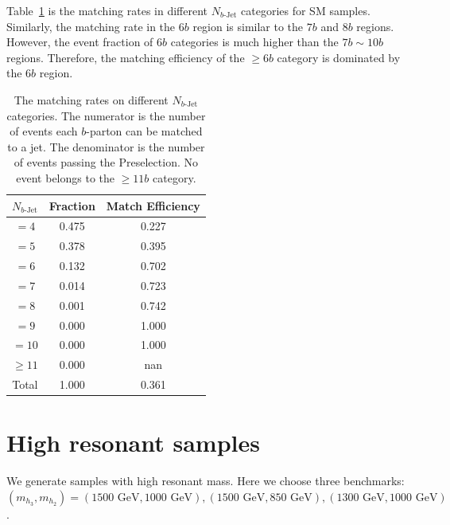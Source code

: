 \documentclass[12pt]{article}
\begin{document}
    Table~\ref{tab:sm_match_rate_nbj_11b} is the matching rates in different $N_{b\text{-Jet}}$ categories for SM samples. Similarly, the matching rate in the $6b$ region is similar to the $7b$ and $8b$ regions. However, the event fraction of $6b$ categories is much higher than the $7b \sim 10b$ regions. Therefore, the matching efficiency of the $\ge 6b$ category is dominated by the $6b$ region.
    \begin{table}[htpb]
        \centering
        \caption{The matching rates on different $N_{b\text{-Jet}}$ categories. The numerator is the number of events each $b$-parton can be matched to a jet. The denominator is the number of events passing the Preselection. No event belongs to the $\ge 11b$ category.}
        \label{tab:sm_match_rate_nbj_11b}
        \begin{tabular}{c|c|c}
        $N_{b\text{-Jet}}$    & Fraction  & Match Efficiency     \\ \hline
        $=4$                  & 0.475 & 0.227 \\
        $=5$                  & 0.378 & 0.395 \\
        $=6$                  & 0.132 & 0.702 \\
        $=7$                  & 0.014 & 0.723 \\
        $=8$                  & 0.001 & 0.742 \\
        $=9$                  & 0.000 & 1.000 \\
        $=10$                 & 0.000 & 1.000 \\
        $\ge 11$              & 0.000 & nan   \\ \hline
        Total                 & 1.000 & 0.361
        \end{tabular}
    \end{table}
\section{High resonant samples}%
\label{sec:high_resonant_samples}
    We generate samples with high resonant mass. Here we choose three benchmarks: $(m_{h_3}, m_{h_2}) = (\text{1500 GeV}, \text{1000 GeV}), (\text{1500 GeV},\text{850 GeV}), (\text{1300 GeV}, \text{1000 GeV})$.
\end{document}
